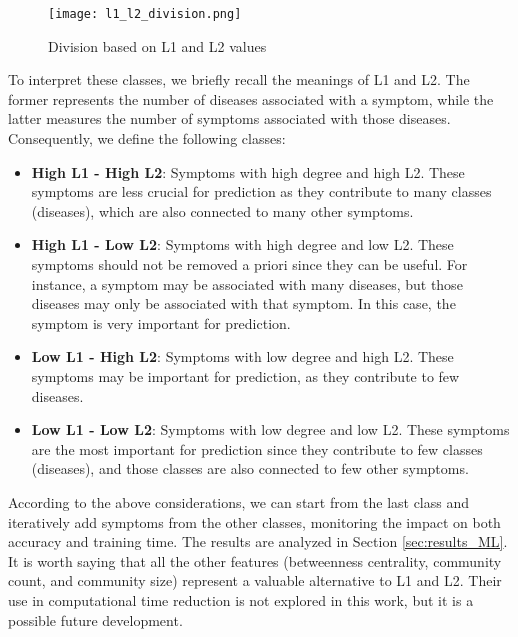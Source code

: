 \begin{figure}[H]
    \centering
    \texttt{[image: l1\_l2\_division.png]}
    \caption{Division based on L1 and L2 values}
    \label{fig:l1_l2_division}
\end{figure}
\noindent
To interpret these classes, we briefly recall the meanings of L1 and L2. The former represents the number of diseases
associated with a symptom, while the latter measures the number of symptoms associated with those diseases.
Consequently, we define the following classes:\\

\begin{itemize}
    \setlength\itemsep{1em}
    \item \textbf{High L1 - High L2}: Symptoms with high degree and high L2. These symptoms are less crucial for
          prediction as they contribute to many classes (diseases), which are also connected to many other symptoms.
    \item \textbf{High L1 - Low L2}: Symptoms with high degree and low L2. These symptoms should not be removed a
          priori since they can be useful. For instance, a symptom may be associated with many diseases, but those
          diseases may only be associated with that symptom. In this case, the symptom is very important for prediction.
    \item \textbf{Low L1 - High L2}: Symptoms with low degree and high L2. These symptoms may be important for
          prediction, as they contribute to few diseases.
    \item \textbf{Low L1 - Low L2}: Symptoms with low degree and low L2. These symptoms are the most important
          for prediction since they contribute to few classes (diseases), and those classes are also connected to
          few other symptoms.
\end{itemize}
\vspace{0.4cm}
\noindent
According to the above considerations, we can start from the last class and iteratively add symptoms from the
other classes, monitoring the impact on both accuracy and training time.
The results are analyzed in Section \ref{sec:results_ML}.\\
It is worth saying that all the other features (betweenness centrality, community count, and community size)
represent a valuable alternative to L1 and L2. Their use in computational time reduction is not explored in this work,
but it is a possible future development.




